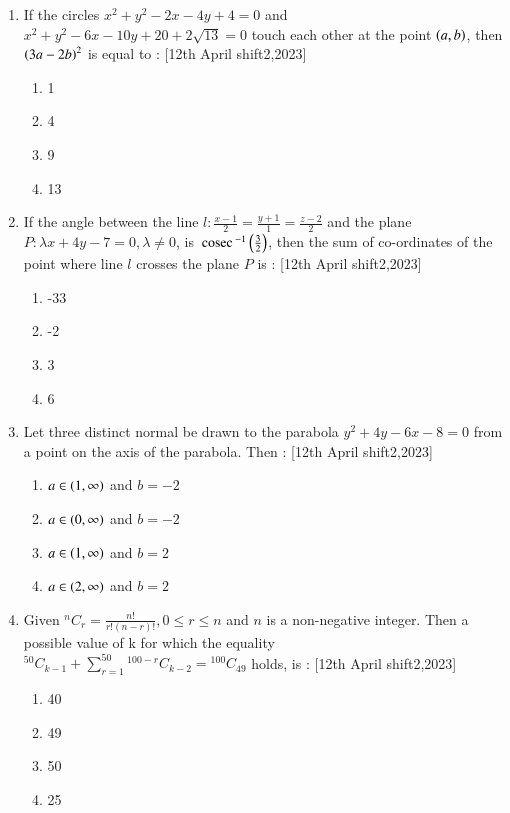 \documentclass[journal]{IEEEtran}
\begin{document}
\begin{enumerate}[start=16]
\item If the circles $x^2+y^2-2x-4y+4=0$ and $x^2+y^2-6x-10y+20+2\sqrt{13}=0$ touch each other at the point $\left(a,b\right)$, then $\left(3a-2b\right)^2$ is equal to : \hfill{[12th April shift2,2023]}
\begin{enumerate}
    \item 1
    \item 4
    \item 9
    \item 13
\end{enumerate}

\item If the angle between the line $l:\frac{x-1}{2}=\frac{y+1}{1}=\frac{z-2}{2}$ and the plane $P:\lambda x+4y-7=0, \lambda\neq0$, is $\,\text{cosec}\,^{-1}\left(\frac{3}{2}\right)$, then the sum of co-ordinates of the point where line $l$ crosses the plane $P$  is : \hfill{[12th April shift2,2023]}
\begin{enumerate}
    \item -33
    \item -2
    \item 3
    \item 6
\end{enumerate}

\item Let three distinct normal be drawn to the parabola $y^2+4y-6x-8=0$ from a point  on the axis of the parabola. Then : \hfill{[12th April shift2,2023]}
\begin{enumerate}
    \item $a \in \left(1,\infty\right)$ and $b=-2$
    \item $a \in \left(0,\infty\right)$ and $b=-2$
    \item $a \in \left(1,\infty\right)$ and $b=2$
    \item $a \in \left(2,\infty\right)$ and $b=2$
\end{enumerate}

\item Given ${}^{n}C_{r} = \frac{n!}{r!(n-r)!}, 0\leq r \leq n$ and $n$ is a non-negative integer. Then a possible value of k for which the equality\\
${}^{50}C_{k-1}+\sum_{r=1}^{50}{}^{100-r}C_{k-2}={}^{100}C_{49}$ holds, is : \hfill{[12th April shift2,2023]}
\begin{enumerate}
    \item 40
    \item 49
    \item 50
    \item 25
\end{enumerate}


\end{enumerate}
\end{document}
